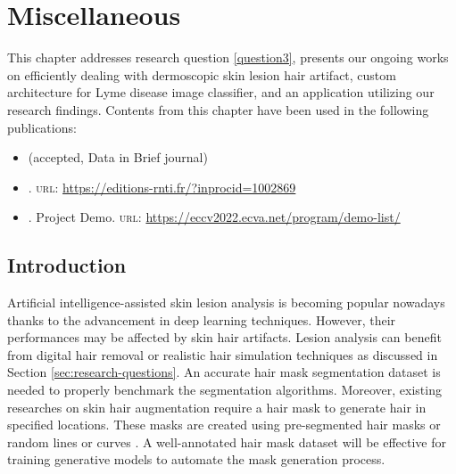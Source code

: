 \chapter{Miscellaneous}\label{chap:inprogress}

\begin{center}
	\begin{minipage}{0.8\textwidth}
		\begin{small}
			This chapter addresses research question \ref{question3}, presents our ongoing works on efficiently dealing with dermoscopic skin lesion hair artifact, custom architecture for Lyme disease image classifier, and an application utilizing our research findings. Contents from this chapter have been used in the following publications:
			\begin{itemize}
				\item {} (accepted, Data in Brief journal)
				\item {}.  \textsc{url}: \url{https://editions-rnti.fr/?inprocid=1002869}
				\item {}. Project Demo. \textsc{url}: \url{https://eccv2022.ecva.net/program/demo-list/}
			\end{itemize}  
		\end{small}
	\end{minipage}
	\vspace{0.5cm}
\end{center}

\minitoc


\section{Introduction}
Artificial intelligence-assisted skin lesion analysis is becoming popular nowadays thanks to the advancement in deep learning techniques. However, their performances may be affected by skin hair artifacts. Lesion analysis can benefit from digital hair removal or realistic hair simulation techniques as discussed in Section \ref{sec:research-questions}. An accurate hair mask segmentation dataset is needed to properly benchmark the segmentation algorithms. Moreover, existing researches on skin hair augmentation require a hair mask to generate hair in specified locations. These masks are created using pre-segmented hair masks or random lines or curves \cite{Attia2020}. A well-annotated hair mask dataset will be effective for training generative models to automate the mask generation process. 

